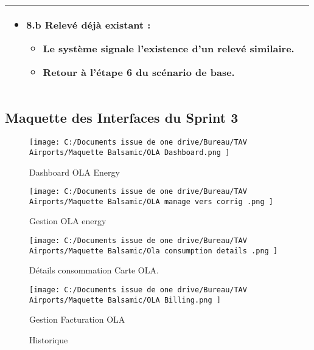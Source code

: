 \documentclass[a4paper,11pt]{report}
\begin{document}
\begin{table}[H]
\begin{tabularx}{\textwidth}{|l|X|}
\begin{itemize}
  \item \textbf{8.b Relevé déjà existant :}
  \begin{itemize}
    \item Le système signale l’existence d’un relevé similaire.
    \item Retour à l’étape 6 du scénario de base.
  \end{itemize}
\end{itemize} \\ \hline

  \end{tabularx}
\end{table}

\subsection{Maquette des Interfaces du Sprint 3}

\begin{figure}[H]
  \centering
  \texttt{[image: C:/Documents issue de one drive/Bureau/TAV Airports/Maquette Balsamic/OLA Dashboard.png
]}
  \caption{Dashboard OLA Energy }
  \label{fig:clone-result}
\end{figure}


\begin{figure}[H]
  \centering
  \texttt{[image: C:/Documents issue de one drive/Bureau/TAV Airports/Maquette Balsamic/OLA manage vers corrig .png
]}
  \caption{Gestion OLA energy 
 }
  \label{fig:clone-result}
\end{figure}

\begin{figure}[H]
  \centering
  \texttt{[image: C:/Documents issue de one drive/Bureau/TAV Airports/Maquette Balsamic/Ola consumption details .png
]}
  \caption{ Détails consommation Carte OLA.
 }
  \label{fig:clone-result}
\end{figure}


\begin{figure}[H]
  \centering
  \texttt{[image: C:/Documents issue de one drive/Bureau/TAV Airports/Maquette Balsamic/OLA Billing.png
]}
  \caption{ Gestion Facturation OLA
 }
  \label{fig:clone-result}
\end{figure}
\begin{figure}[H]
  \centering
  \caption{  Historique 
 }
  \label{fig:clone-result}
\end{figure}
\end{document}

